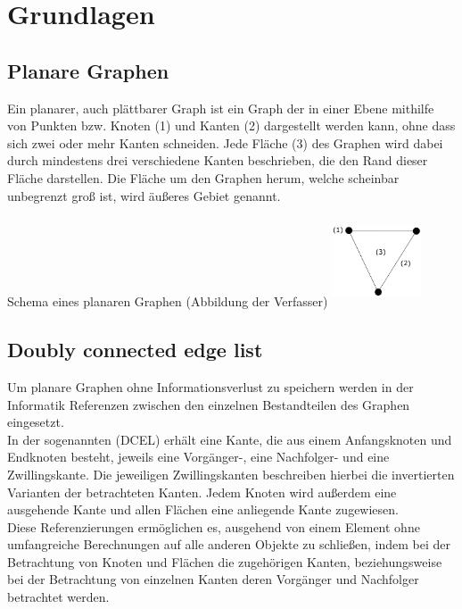 \chapter{Grundlagen}
\section{Planare Graphen}
Ein planarer, auch plättbarer Graph ist ein Graph der in einer Ebene mithilfe von Punkten bzw. Knoten (1) und Kanten (2) dargestellt werden kann, ohne dass sich zwei oder mehr Kanten schneiden. 
Jede Fläche (3) des Graphen wird dabei durch mindestens drei verschiedene Kanten beschrieben, die den Rand dieser Fläche darstellen. 
Die Fläche um den Graphen herum, welche scheinbar unbegrenzt groß ist, wird äußeres Gebiet genannt.
\begin{Bild}{Schema eines planaren Graphen (Abbildung der Verfasser)}
	\includegraphics[width = 100px, height = 100px]{Bilder/Graph_Scheme}
\end{Bild}
\section{Doubly connected edge list}
Um planare Graphen ohne Informationsverlust zu speichern werden in der Informatik Referenzen zwischen den einzelnen Bestandteilen des Graphen eingesetzt. \\
In der sogenannten  (DCEL) erhält eine Kante, die aus einem Anfangsknoten und Endknoten besteht, jeweils eine Vorgänger-, eine Nachfolger- und eine Zwillingskante. 
Die jeweiligen Zwillingskanten beschreiben hierbei die invertierten Varianten der betrachteten Kanten.
Jedem Knoten wird außerdem eine ausgehende Kante und allen Flächen eine anliegende Kante zugewiesen. \\
Diese Referenzierungen ermöglichen es, ausgehend von einem Element ohne umfangreiche Berechnungen auf alle anderen Objekte zu schließen, indem bei der Betrachtung von Knoten und Flächen die zugehörigen Kanten, beziehungsweise bei der Betrachtung von einzelnen Kanten deren Vorgänger und Nachfolger betrachtet werden.
